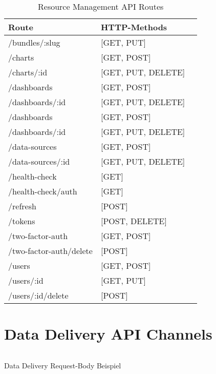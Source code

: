 \begin{table}[h]
\begin{center}
\begin{tabular}{llc}
Route & HTTP-Methods \\
\hline
/bundles/:slug          & [GET, PUT]         \\
/charts                 & [GET, POST]        \\
/charts/:id             & [GET, PUT, DELETE] \\
/dashboards             & [GET, POST]        \\
/dashboards/:id         & [GET, PUT, DELETE] \\
/dashboards             & [GET, POST]        \\
/dashboards/:id         & [GET, PUT, DELETE] \\
/data-sources           & [GET, POST]        \\
/data-sources/:id       & [GET, PUT, DELETE] \\
/health-check           & [GET]              \\
/health-check/auth      & [GET]              \\
/refresh                & [POST]             \\
/tokens                 & [POST, DELETE]     \\
/two-factor-auth        & [GET, POST]        \\
/two-factor-auth/delete & [POST]             \\
/users                  & [GET, POST]        \\
/users/:id              & [GET, PUT]         \\
/users/:id/delete       & [POST]             \\
\end{tabular}
\end{center}
\caption{Resource Management API Routes}
\label{tab:resourcemanagementapiroutes}
\end{table}

\newpage

\section*{Data Delivery API Channels}
\label{sec:resourcemanagementapiroutes}

\begin{listing}[h]
    \inputminted{jsx}{snippets/json/data-delivery-example/request.data-delivery.txt}
    \caption{Data Delivery Request-Body Beispiel}
    \label{lst:datadelvieryrequestbodybeispiel}
\end{listing}

